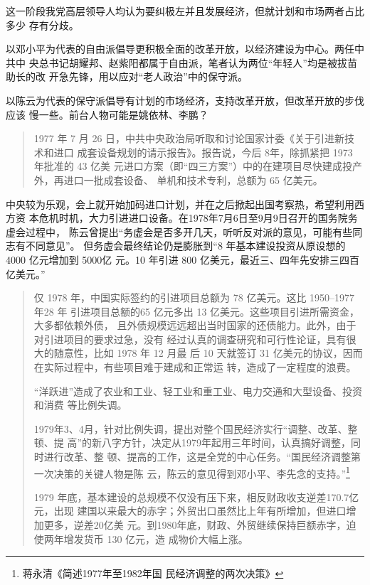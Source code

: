 

这一阶段我党高层领导人均认为要纠极左并且发展经济，但就计划和市场两者占比多少
存有分歧。

以邓小平为代表的自由派倡导更积极全面的改革开放，以经济建设为中心。两任中共中
央总书记胡耀邦、赵紫阳都属于自由派，笔者认为两位“年轻人”均是被拔苗助长的改
开急先锋，用以应对“老人政治”中的保守派。

以陈云为代表的保守派倡导有计划的市场经济，支持改革开放，但改革开放的步伐应该
慢一些。前台人物可能是姚依林、李鹏？

\begin{quotation}
  1977 年 7 月 26 日，中共中央政治局听取和讨论国家计委《关于引进新技术和进口
  成套设备规划的请示报告》。报告说，今后 8年，除抓紧把 1973 年批准的 43 亿美
  元进口方案（即“四三方案”）中的在建项目尽快建成投产外，再进口一批成套设备、
  单机和技术专利，总额为 65 亿美元。\cite{yangyuejin}
\end{quotation}
中央较为乐观，会上就开始加码进口计划，并在之后掀起出国考察热，希望利用西方资
本危机时机，大力引进进口设备。在1978年7月6日至9月9日召开的国务院务虚会过程中，
陈云曾提出“务虚会是否多开几天，听听反对派的意见，可能有些同志有不同意见”。
但务虚会最终结论仍是膨胀到“8 年基本建设投资从原设想的 4000 亿元增加到 5000亿
元。10 年引进 800 亿美元，最近三、四年先安排三四百亿美元。”
\begin{quotation}
  仅 1978 年，中国实际签约的引进项目总额为 78 亿美元。这比 1950--1977年28 年
  引进项目总额的65 亿元多出 13 亿美元。这些项目引进所需资金，大多都依赖外债，
  且外债规模远远超出当时国家的还债能力。此外，由于对引进项目的要求过急，没有
  经过认真的调查研究和可行性论证，具有很大的随意性，比如 1978 年 12 月最
  后 10 天就签订 31 亿美元的协议，因而在实际过程中，有些项目难于建成和正常运
  转，造成了一定程度的浪费。\cite{yangyuejin}

  “洋跃进”造成了农业和工业、轻工业和重工业、电力交通和大型设备、投资和消费
  等比例失调。

  1979年3、4月，针对比例失调，提出对整个国民经济实行“调整、改革、整顿、提
  高”的新八字方针，决定从1979年起用三年时间，认真搞好调整，同时进行改革、整
  顿、提高的工作，这是全党的中心任务。“国民经济调整第一次决策的关键人物是陈
  云，陈云的意见得到邓小平、李先念的支持。”\footnote{蒋永清\quad 《简述1977年至1982年国
    民经济调整的两次决策》}

  1979 年底，基本建设的总规模不仅没有压下来，相反财政收支逆差170.7亿元，出现
  建国以来最大的赤字；外贸出口虽然比上年有所增加，但进口增加更多，逆差20亿美
  元。到1980年底，财政、外贸继续保持巨额赤字，迫使两年增发货币 130 亿元，造
  成物价大幅上涨。\cite{chenyunjihua}
\end{quotation}

